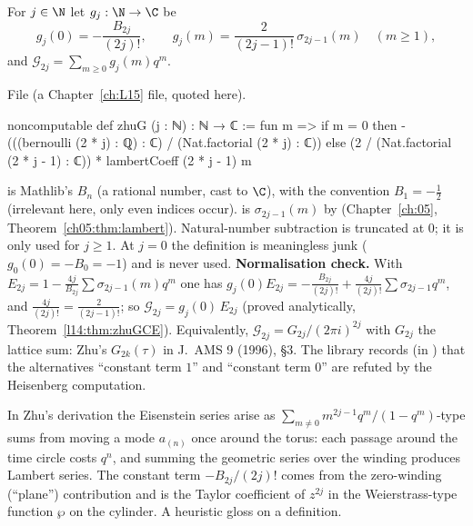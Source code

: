 \begin{definition}\label{l14:def:zhuG}
For $j\in\N$ let $g_j:\N\to\C$ be
\begin{equation*}
  g_j(0) = -\frac{B_{2j}}{(2j)!},\qquad g_j(m) = \frac{2}{(2j-1)!}\,\sigma_{2j-1}(m)\quad(m\ge1),
\end{equation*}
and $\mathcal G_{2j} = \sum_{m\ge0}g_j(m)q^m$.
\end{definition}
\noindent File  (a Chapter~\ref{ch:L15} file, quoted here).
\begin{leancode}
noncomputable def zhuG (j : ℕ) : ℕ → ℂ :=
  fun m =>
    if m = 0 then -(((bernoulli (2 * j) : ℚ) : ℂ) / (Nat.factorial (2 * j) : ℂ))
    else (2 / (Nat.factorial (2 * j - 1) : ℂ)) * lambertCoeff (2 * j - 1) m
\end{leancode}
\begin{dictionary}
 is Mathlib's $B_n$ (a rational number, cast to $\C$), with the convention $B_1 = -\tfrac12$ (irrelevant
here, only even indices occur).  is $\sigma_{2j-1}(m)$ by 
(Chapter~\ref{ch:05}, Theorem~\ref{ch05:thm:lambert}). Natural-number subtraction  is truncated at $0$; it
is only used for $j\ge1$. At $j=0$ the definition is meaningless junk ($g_0(0) = -B_0 = -1$) and is never used.
\textbf{Normalisation check.} With $E_{2j} = 1 - \frac{4j}{B_{2j}}\sum\sigma_{2j-1}(m)q^m$ one has
$g_j(0)E_{2j} = -\frac{B_{2j}}{(2j)!} + \frac{4j}{(2j)!}\sum\sigma_{2j-1}q^m$, and $\frac{4j}{(2j)!} =
\frac{2}{(2j-1)!}$; so $\mathcal G_{2j} = g_j(0)\,E_{2j}$ (proved analytically, Theorem~\ref{l14:thm:zhuGCE}). Equivalently,
$\mathcal G_{2j} = G_{2j}/(2\pi i)^{2j}$ with $G_{2j}$ the lattice sum: Zhu's $G_{2k}(\tau)$ in J.~AMS 9 (1996), §3. The library
records (in ) that the alternatives ``constant term $1$'' and ``constant term $0$'' are
refuted by the Heisenberg computation.
\end{dictionary}
\begin{physics}
In Zhu's derivation the Eisenstein series arise as $\sum_{m\neq0} m^{2j-1}q^m/(1-q^m)$-type sums from moving a mode
$a_{(n)}$ once around the torus: each passage around the time circle costs $q^{n}$, and summing the geometric series over
the winding produces Lambert series. The constant term $-B_{2j}/(2j)!$ comes from the zero-winding (``plane'') contribution
and is the Taylor coefficient of $z^{2j}$ in the Weierstrass-type function $\wp$ on the cylinder. A heuristic gloss on a
definition.
\end{physics}

